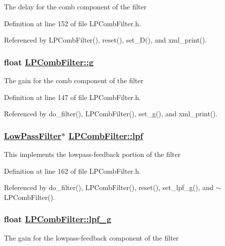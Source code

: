 The delay for the comb component of the filter 

Definition at line 152 of file LPComb\-Filter.h.

Referenced by LPComb\-Filter(), reset(), set\_\-D(), and xml\_\-print().\hypertarget{classLPCombFilter_r0}{
\subsubsection[g]{\setlength{\rightskip}{0pt plus 5cm}float \hyperlink{classLPCombFilter_r0}{LPComb\-Filter::g}}}
\label{classLPCombFilter_r0}


The gain for the comb component of the filter 

Definition at line 147 of file LPComb\-Filter.h.

Referenced by do\_\-filter(), LPComb\-Filter(), set\_\-g(), and xml\_\-print().\hypertarget{classLPCombFilter_r3}{
\subsubsection[lpf]{\setlength{\rightskip}{0pt plus 5cm}\hyperlink{classLowPassFilter}{Low\-Pass\-Filter}$\ast$ \hyperlink{classLPCombFilter_r3}{LPComb\-Filter::lpf}}}
\label{classLPCombFilter_r3}


This implements the lowpass-feedback portion of the filter 

Definition at line 162 of file LPComb\-Filter.h.

Referenced by do\_\-filter(), LPComb\-Filter(), reset(), set\_\-lpf\_\-g(), and $\sim$LPComb\-Filter().\hypertarget{classLPCombFilter_r2}{
\subsubsection[lpf\_\-g]{\setlength{\rightskip}{0pt plus 5cm}float \hyperlink{classLPCombFilter_r2}{LPComb\-Filter::lpf\_\-g}}}
\label{classLPCombFilter_r2}


The gain for the lowpass-feedback component of the filter 

